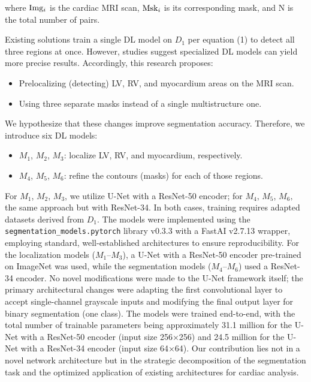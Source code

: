 \documentclass[fleqn,10pt]{wlscirep}
\begin{document}
where \({\rm{Im}}{{\rm{g}}_i}\) is the cardiac MRI scan, \({\rm{Ms}}{{\rm{k}}_i}\) is its corresponding mask, and N is the total number of pairs.

Existing solutions train a single DL model on \({D_1}\) per equation (1) to detect all three regions at once. However, studies \cite{Wehbe:2023,Pandey:2023} suggest specialized DL models can yield more precise results. Accordingly, this research proposes:

\begin{itemize}
    \item Prelocalizing (detecting) LV, RV, and myocardium areas on the MRI scan.
    \item Using three separate masks instead of a single multistructure one.
\end{itemize}

We hypothesize that these changes improve segmentation accuracy. Therefore, we introduce six DL models:

\begin{itemize}
    \item \({M_1}\), \({M_2}\), \({M_3}\): localize LV, RV, and myocardium, respectively.
    \item \({M_4}\), \({M_5}\), \({M_6}\): refine the contours (masks) for each of those regions.
\end{itemize}

For \({M_1}\), \({M_2}\), \({M_3}\), we utilize U-Net with a ResNet-50 encoder; for \({M_4}\), \({M_5}\), \({M_6},\) the same approach but with ResNet-34. In both cases, training requires adapted datasets derived from \({D_1}\).
The models were implemented using the \texttt{segmentation\_models.pytorch} library v0.3.3 with a FastAI v2.7.13 wrapper, employing standard, well-established architectures to ensure reproducibility. For the localization models (\({M_1}\)–\({M_3}\)), a U-Net with a ResNet-50 encoder pre-trained on ImageNet was used, while the segmentation models (\({M_4}\)–\({M_6}\)) used a ResNet-34 encoder. No novel modifications were made to the U-Net framework itself; the primary architectural changes were adapting the first convolutional layer to accept single-channel grayscale inputs and modifying the final output layer for binary segmentation (one class). The models were trained end-to-end, with the total number of trainable parameters being approximately 31.1 million for the U-Net with a ResNet-50 encoder (input size 256×256) and 24.5 million for the U-Net with a ResNet-34 encoder (input size 64×64). Our contribution lies not in a novel network architecture but in the strategic decomposition of the segmentation task and the optimized application of existing architectures for cardiac analysis.
\end{document}
